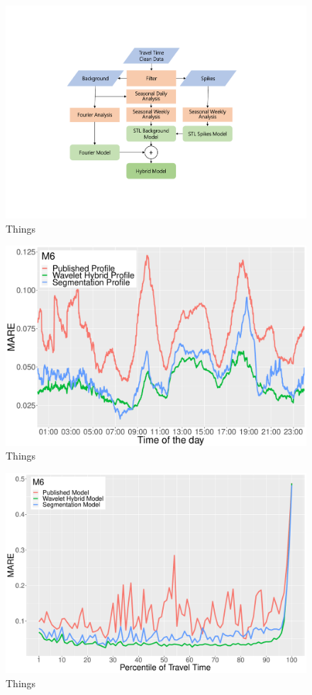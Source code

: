 \documentclass[letterpaper, 10 pt, conference]{ieeeconf}  %
\begin{document}
\begin{figure}[htbp]
	\centerline{\includegraphics[width=\linewidth]{./images/flow_temp.pdf}}
	\caption{Things}
	\label{fig:dataflow}
\end{figure}

\begin{figure}[htbp]
	\centerline{\includegraphics[width=\linewidth]{./images/M6_daytime_8_12.pdf}}
	\caption{Things}
	\label{fig:m6dt}
\end{figure}

\begin{figure}[htbp]
	\centerline{\includegraphics[width=\linewidth]{./images/M6_quantile_1_rms_8_12.pdf}}
	\caption{Things}
	\label{fig:m6q}
\end{figure}
\end{document}
